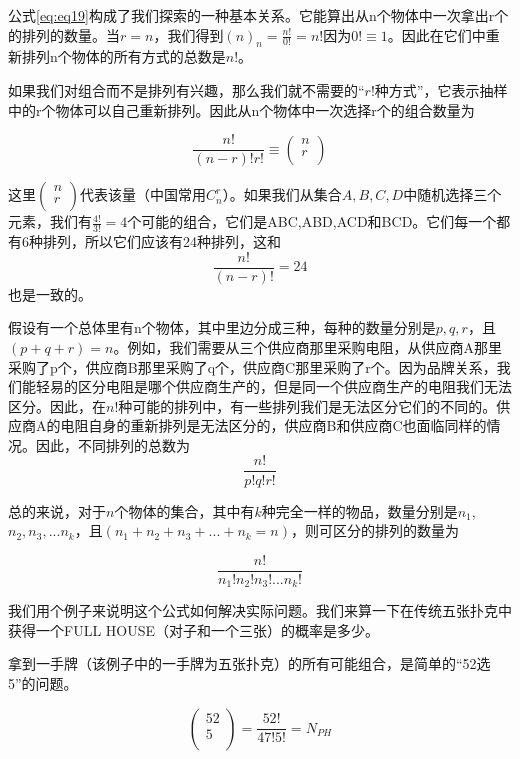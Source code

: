 \documentclass[cn,11pt,chinese]{elegantbook}
\begin{document}
公式\ref{eq:eq19}构成了我们探索的一种基本关系。它能算出从n个物体中一次拿出r个的排列的数量。当$r=n$，我们得到$(n)_n=\frac{n!}{0!}=n!$因为$0!\equiv 1$。因此在它们中重新排列n个物体的所有方式的总数是$n!$。

如果我们对组合而不是排列有兴趣，那么我们就不需要的“$r!种方式$”，它表示抽样中的r个物体可以自己重新排列。因此从n个物体中一次选择r个的组合数量为

\begin{equation} \label{eq20}
\frac{n!}{(n-r)!r!}
\equiv
\begin{pmatrix}
n \\ r \\
\end{pmatrix}
\end{equation}

这里$\begin{pmatrix} n\\r\\ \end{pmatrix}$代表该量（中国常用$C_n^r$）。如果我们从集合${A,B,C,D}$中随机选择三个元素，我们有$\frac{4!}{3!}=4$个可能的组合，它们是ABC,ABD,ACD和BCD。它们每一个都有6种排列，所以它们应该有24种排列，这和
$$
\frac{n!}{(n-r)!}=24$$
也是一致的。

假设有一个总体里有n个物体，其中里边分成三种，每种的数量分别是$p,q,r$，且$(p+q+r)=n$。例如，我们需要从三个供应商那里采购电阻，从供应商A那里采购了p个，供应商B那里采购了q个，供应商C那里采购了r个。因为品牌关系，我们能轻易的区分电阻是哪个供应商生产的，但是同一个供应商生产的电阻我们无法区分。因此，在$n!$种可能的排列中，有一些排列我们是无法区分它们的不同的。供应商A的电阻自身的重新排列是无法区分的，供应商B和供应商C也面临同样的情况。因此，不同排列的总数为
\begin{equation}
\frac{n!}{p!q!r!}
\end{equation}

总的来说，对于$n$个物体的集合，其中有$k$种完全一样的物品，数量分别是$n_1$,$n_2,n_3,...n_k$，且$(n_1+n_2+n_3+...+n_k=n)$，则可区分的排列的数量为

\begin{equation}\label{key}
\frac{n!}{n_1!n_2!n_3!...n_k!} 
\end{equation}

我们用个例子来说明这个公式如何解决实际问题。我们来算一下在传统五张扑克中获得一个FULL HOUSE（对子和一个三张）的概率是多少。

拿到一手牌（该例子中的一手牌为五张扑克）的所有可能组合，是简单的“52选5”的问题。

$$
\begin{pmatrix} 52 \\ 5 \\ \end{pmatrix} = \frac{52!}{47!5!}=N_{PH}
$$
\end{document}
